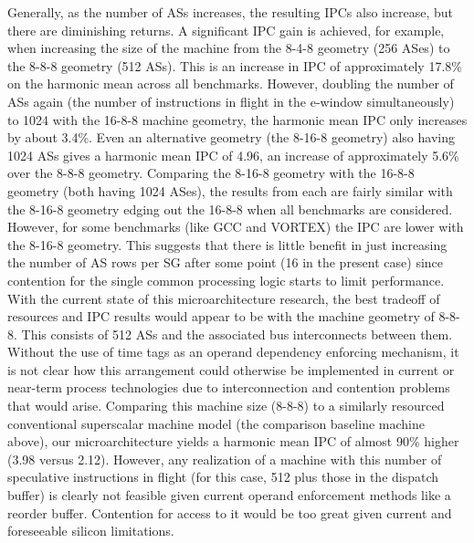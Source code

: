 \documentclass[10pt,twocolumn]{article}
\begin{document}
Generally, as the number of ASs increases,
the resulting IPCs also increase, but there are diminishing returns.
A significant IPC gain is achieved, for example, when increasing the
size of the machine from the 8-4-8 geometry (256 ASes) to the 8-8-8 geometry
(512 ASs).  This is an increase in IPC of approximately 17.8\% on the
harmonic mean across all benchmarks.  However, doubling the number
of ASs again (the number of instructions in flight
in the e-window simultaneously) to 1024 with the 16-8-8 machine geometry,
the harmonic mean IPC only increases by about 3.4\%.  Even an
alternative geometry (the 8-16-8 geometry) also having 1024 ASs
gives a harmonic mean IPC of 4.96, an increase of approximately 5.6\%
over the 8-8-8 geometry.
Comparing the 8-16-8 geometry with the 16-8-8 geometry (both having
1024 ASes), the results from each are fairly similar with the
8-16-8 geometry edging out the 16-8-8 when all benchmarks are
considered.  However, for some benchmarks (like GCC and VORTEX)
the IPC are lower with the 8-16-8 geometry.  This suggests that
there is little benefit in just increasing the number of AS
rows per SG after some point (16 in the present case)
since contention for the single common processing logic starts
to limit performance.
With the current state of this microarchitecture research,
the best tradeoff of resources and IPC results would appear
to be with the machine geometry of 8-8-8.  This consists of 512
ASs and the associated bus interconnects between them. 
Without the use of time tags as an operand dependency enforcing
mechanism, it is not clear how this arrangement could otherwise be 
implemented
in current or near-term process technologies due to interconnection
and contention problems that would arise.
Comparing this machine size (8-8-8) to a similarly resourced
conventional superscalar machine model (the comparison baseline machine
above),
our microarchitecture yields a
harmonic mean IPC of almost 90\% higher (3.98 versus 2.12).
However, 
any realization of a machine with this number of speculative
instructions in flight (for this case, 512 plus those in the dispatch buffer) 
is clearly not
feasible given current operand enforcement methods like
a reorder buffer.  Contention for access to it would be too great
given current and foreseeable silicon limitations.
\end{document}
